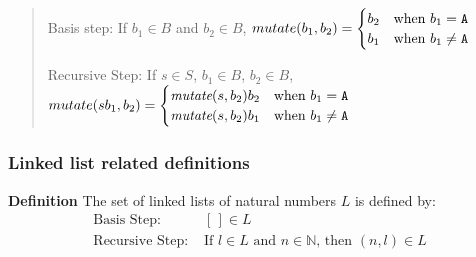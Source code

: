 \documentclass[12pt, oneside]{article}
\begin{document}
\begin{quote}
Basis step: If  $b_1 \in B$ and $b_2 \in B$, $mutate(b_1, b_2) =
        \begin{cases}
            b_2 & \textrm{when } b_1 = \texttt{A} \\
            b_1 & \textrm{when } b_1 \neq \texttt{A} \\
        \end{cases}$

Recursive Step: If $s \in S$, $b_1 \in B$, $b_2 \in B$, $mutate(sb_1, b_2) =
        \begin{cases}
            \textit{mutate}(s, b_2)b_2 & \textrm{when } b_1 = \texttt{A} \\
            \textit{mutate}(s, b_2)b_1 & \textrm{when } b_1 \neq \texttt{A} \\
        \end{cases}$
\end{quote}

\newpage
\subsubsection*{Linked list related definitions}

{\bf Definition} The set of linked lists of natural numbers $L$ is defined by:
\[
\begin{array}{ll}
    \textrm{Basis Step: } & [\,] \in L \\
    \textrm{Recursive Step: } & \textrm{If } l \in L\textrm{ and }n \in \mathbb{N} \textrm{, then } (n, l) \in L
\end{array}
\]
%
\end{document}
